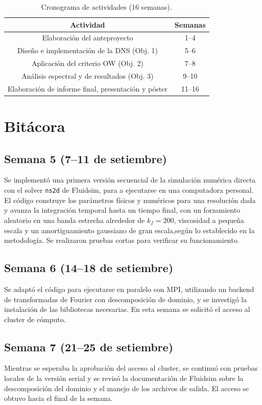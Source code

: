 \begin{table}[h]
\centering
\scriptsize
\setlength{\tabcolsep}{2pt}
\begin{tabular}{cc}  %
\hline
\textbf{Actividad} & \textbf{Semanas} \\
\hline
Elaboración del anteproyecto & 1--4 \\
\hline
Diseño e implementación de la DNS (Obj. 1) & 5--6 \\
\hline
Aplicación del criterio OW (Obj. 2) & 7--8 \\
\hline
Análisis espectral y de resultados (Obj. 3) & 9--10 \\
\hline
Elaboración de informe final, presentación y póster & 11--16 \\
\hline
\end{tabular}
\caption{Cronograma de actividades (16 semanas).}
\label{tab:cronograma}
\end{table}

\section{Bitácora}

\subsection*{Semana 5 (7--11 de setiembre)}
Se implementó una primera versión secuencial de la simulación 
numérica directa con el solver \texttt{ns2d} de Fluidsim, 
para a ejecutarse en una computadora personal. 
El código construye los parámetros físicos y numéricos 
para una resolución dada y avanza la integración temporal 
hasta un tiempo final, con un forzamiento aleatorio en una 
banda estrecha alrededor de $k_f = 200$, 
viscosidad a pequeña escala y un amortiguamiento 
gaussiano de gran escala,según lo establecido en la metodología. 
Se realizaron pruebas  cortas para verificar su funcionamiento.

\subsection*{Semana 6 (14--18 de setiembre)}
Se adaptó el código para ejecutarse en paralelo con MPI, 
utilizando un backend de transformadas de Fourier con descomposición 
de dominio, y se investigó la instalación de las bibliotecas necesarias. 
En esta semana se solicitó el acceso al cluster de cómputo.

\subsection*{Semana 7 (21--25 de setiembre)}
Mientras se esperaba la aprobación del acceso al 
cluster, se continuó con pruebas locales de la versión 
serial y se revisó la documentación de Fluidsim sobre la 
descomposición del dominio y el manejo de los archivos de salida. 
El acceso se obtuvo hacia el final de la semana.

